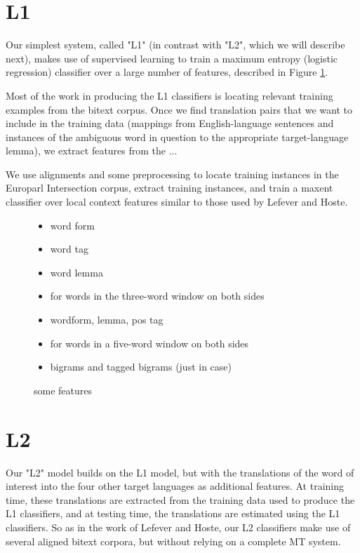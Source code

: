 \documentclass[11pt,letterpaper]{article}
\begin{document}
\section{L1}
Our simplest system, called "L1" (in contrast with "L2", which we will describe
next), makes use of supervised learning to train a maximum entropy (logistic
regression) classifier over a large number of features, described in Figure
\ref{features}.

Most of the work in producing the L1 classifiers is locating relevant training
examples from the bitext corpus.
Once we find translation pairs that we want to include in the training data
(mappings from English-language sentences and instances of the ambiguous word
in question to the appropriate target-language lemma), we extract features from
the ...

We use alignments and some preprocessing to locate training instances in the
Europarl Intersection corpus, extract training instances, and train a maxent
classifier over local context features similar to those used by Lefever and
Hoste.

\begin{figure}
  \begin{itemize}
  \item word form
  \item word tag
  \item word lemma
  \item for words in the three-word window on both sides
  \item wordform, lemma, pos tag
  \item for words in a five-word window on both sides
  \item bigrams and tagged bigrams (just in case)
  \end{itemize}
  \label{features}
  \caption{some features}
\end{figure}


\section{L2}
Our "L2" model builds on the L1 model, but with the translations of the word of
interest into the four other target languages as additional features. At
training time, these translations are extracted from the training data used to
produce the L1 classifiers, and at testing time, the translations are estimated
using the L1 classifiers. So as in the work of Lefever and Hoste, our L2
classifiers make use of several aligned bitext corpora, but without relying on
a complete MT system.
\end{document}
